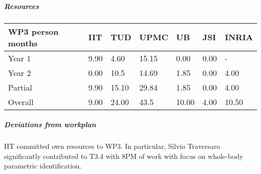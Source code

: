 
\subparagraph{Resources}

\begin{center}
\begin{tabular}{|C{1.5cm}|C{1.5cm}|C{1.5cm}|C{2cm}|C{2cm}|C{2cm}|C{2cm}|}
\hline
\footnotesize \textbf{WP3 person months} & \footnotesize \textbf{IIT}&\footnotesize \textbf{TUD}&\footnotesize \textbf{UPMC}& \footnotesize \textbf{UB} &\footnotesize \textbf{JSI} &\footnotesize \textbf{INRIA} \\ \hline
\footnotesize Year 1 &  9.90 & 4.60 & 15.15 & 0.00 & 0.00 &  -   \\  \hline
\footnotesize Year 2 &  0.00 & 10.5 & 14.69 & 1.85 & 0.00 &  4.00  \\  \hline
\footnotesize Partial &  9.90 & 15.10 & 29.84 & 1.85 & 0.00 & 4.00 \\ \hline \hline
\footnotesize Overall &  9.00 & 24.00 & 43.5 & 10.00 & 4.00 & 10.50 \\ \hline
\end{tabular}
\end{center}

\subparagraph{Deviations from workplan} 
IIT committed own resources to WP3. In particular, Silvio Traversaro significantly contributed to T3.4 with 8PM of work with focus on whole-body parametric identification. 
